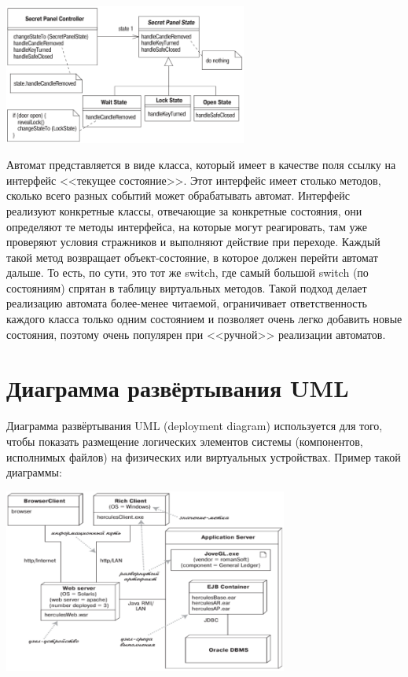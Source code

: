 \documentclass{../../text-style}
\begin{document}
\begin{center}
    \includegraphics[width=0.6\textwidth]{stateTransitionStatePattern.png}
\end{center}

Автомат представляется в виде класса, который имеет в качестве поля ссылку на интерфейс <<текущее состояние>>. Этот интерфейс имеет столько методов, сколько всего разных событий может обрабатывать автомат. Интерфейс реализуют конкретные классы, отвечающие за конкретные состояния, они определяют те методы интерфейса, на которые могут реагировать, там уже проверяют условия стражников и выполняют действие при переходе. Каждый такой метод возвращает объект-состояние, в которое должен перейти автомат дальше. То есть, по сути, это тот же switch, где самый большой switch (по состояниям) спрятан в таблицу виртуальных методов. Такой подход делает реализацию автомата более-менее читаемой, ограничивает ответственность каждого класса только одним состоянием и позволяет очень легко добавить новые состояния, поэтому очень популярен при <<ручной>> реализации автоматов.

\section{Диаграмма развёртывания UML}

Диаграмма развёртывания UML (deployment diagram) используется для того, чтобы показать размещение логических элементов системы (компонентов, исполнимых файлов) на физических или виртуальных устройствах. Пример такой диаграммы:

\begin{center}
    \includegraphics[width=0.7\textwidth]{deploymentDiagram.png}
\end{center}
\end{document}
